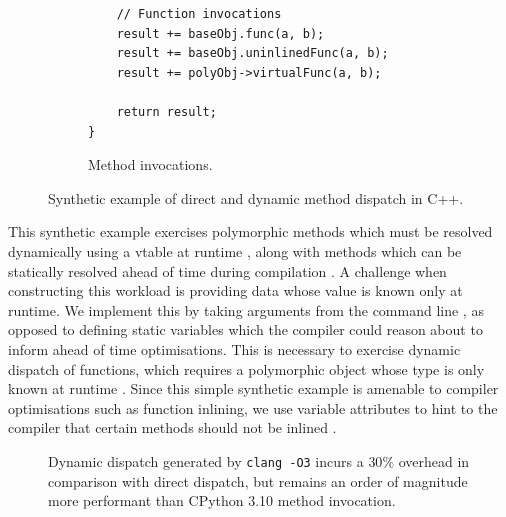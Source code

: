 \begin{figure}[H]
\begin{subfigure}[b]{0.45\textwidth}
\begin{verbatim}
    // Function invocations
    result += baseObj.func(a, b);
    result += baseObj.uninlinedFunc(a, b);
    result += polyObj->virtualFunc(a, b);

    return result;
}
        \end{verbatim}
        \captionsetup{name=Listing}
        \caption{Method invocations.}
        \label{listing:impact-dispatch-invocation}
    \end{subfigure}
    \vspace{1em}
    \captionsetup{name=Listing}
    \caption{Synthetic example of direct and dynamic method dispatch in C++.}
    \label{listing:impact-dispatch}
\end{figure}

This synthetic example exercises polymorphic methods which must be resolved dynamically using a \ac{vtable} at runtime , along with methods which can be statically resolved ahead of time during compilation .
A challenge when constructing this workload is providing data whose value is known only at runtime. We implement this by taking arguments from the command line , as opposed to defining static variables which the compiler could reason about to inform ahead of time optimisations. This is necessary to exercise dynamic dispatch of functions, which requires a polymorphic object whose type is only known at runtime . Since this simple synthetic example is amenable to compiler optimisations such as function inlining, we use variable attributes to hint to the compiler that certain methods should not be inlined .

\begin{figure}[H]
    \centering
    \caption{Dynamic dispatch generated by \texttt{clang -O3} incurs a $30\%$ overhead in comparison with direct dispatch, but remains an order of magnitude more performant than CPython 3.10 method invocation.}
    \label{figure:impact-dispatch}
\end{figure}


